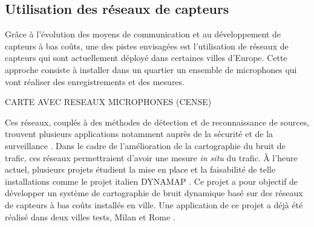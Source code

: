 \subsection{Utilisation des réseaux de capteurs}

Grâce à l'évolution des moyens de communication et au développement de capteurs à bas coûts, une des pistes envisagées est l'utilisation de réseaux de capteurs qui sont actuellement déployé dans certaines villes d'Europe. Cette approche consiste à installer dans un quartier un ensemble de microphones qui vont réaliser des enregistrements et des mesures. 

CARTE AVEC RESEAUX MICROPHONES (CENSE)

Ces réseaux, couplés à des méthodes de détection et de reconnaissance de sources, trouvent plusieurs applications notamment auprès de la sécurité et de la surveillance \cite{simon_sensor_2004} \cite{foggia_audio_2016}. Dans le cadre de l'amélioration de la cartographie du bruit de trafic, ces réseaux permettraient d'avoir une mesure \textit{in situ} du trafic. \`A l'heure actuel, plusieurs projets étudient la mise en place et la faisabilité de telle installations comme le projet italien DYNAMAP \cite{dynamap_2016}. Ce projet a pour objectif de développer un système de cartographie de bruit dynamique basé sur des réseaux de capteurs à bas coûts installés en ville. Une application de ce projet a déjà été réalisé dans deux villes tests, Milan et Rome \cite{bellucci_life_2017}. 

